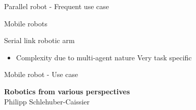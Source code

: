 \documentclass[usenames,dvipsnames,xcolor=table]{beamer}
\begin{document}
\begin{frame}{Parallel robot - Frequent use case}
    \begin{center}
    \end{center}
\end{frame}
\begin{frame}{Mobile robots}
    \begin{center}
        \begin{minipage}{0.49\linewidth}
                \def\svgwidth{\linewidth}
                
        \end{minipage}
        \hfill
        \begin{minipage}{0.49\linewidth}
        \large{Serial link robotic arm}
        \begin{itemize}
            \pro Increases efficiency in warehouses
            \pro Semi-autonomous systems
            \item[]
            \con Complexity due to multi-agent nature
            \con Very task specific
        \end{itemize}
        \end{minipage}
    \end{center}
\end{frame}

\begin{frame}{Mobile robot - Use case}
    \begin{center}
    \end{center}
\end{frame}

\begin{frame}[plain]

\begin{center}
\textbf{\Large Robotics from various perspectives}\\[6pt]
Philipp Schlehuber-Caissier
\end{center}
	
\end{frame}

\end{document}
